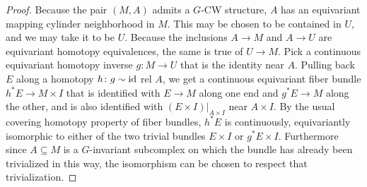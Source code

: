 \documentclass[11pt]{amsart}
\theoremstyle{definition}
\numberwithin{equation}{section}
\numberwithin{figure}{section}
\newcommand{\id}{\textup{id}}
\begin{document}
\begin{proof}
Because the pair $(M,A)$ admits a $G$-CW structure, $A$ has an equivariant mapping cylinder neighborhood in $M$. This may be chosen to be contained in $U$, and we may take it to be $U$. 
Because the inclusions $A\to M$ and $A\to U$ are equivariant homotopy equivalences, the same is true of $U\to M$. Pick a continuous equivariant homotopy inverse $g\colon M \to U$ that is the identity near $A$. Pulling back $E$ along a homotopy $h\colon g \sim \id$ rel $A$, we get a continuous equivariant fiber bundle $h^*E \to M \times I$ that is identified with $E \to M$ along one end and $g^*E \to M$ along the other, and is also identified with $(E \times I)|_{A \times I}$ near $A \times I$. By the usual covering homotopy property of fiber bundles, $h^*E$ is continuously, equivariantly isomorphic to either of the two trivial bundles $E \times I$ or $g^*E \times I$. Furthermore since $A \subseteq M$ is a $G$-invariant subcomplex on which the bundle has already been trivialized in this way, the isomorphism can be chosen to respect that trivialization.


\end{proof}
\end{document}
